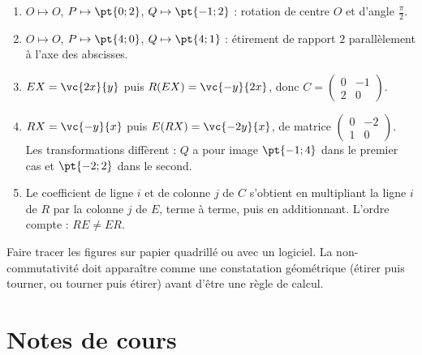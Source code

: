 \begin{solution}[Activité]
\begin{enumerate}
\item $O\mapsto O$, $P\mapsto\pt{0;2}$, $Q\mapsto\pt{-1;2}$ : rotation de centre $O$ et d'angle $\frac\pi2$.
\item $O\mapsto O$, $P\mapsto\pt{4;0}$, $Q\mapsto\pt{4;1}$ : étirement de rapport $2$ parallèlement à l'axe des abscisses.
\item $EX=\vc{2x}{y}$ puis $R(EX)=\vc{-y}{2x}$, donc $C=\begin{pmatrix}0&-1\\2&0\end{pmatrix}$.
\item $RX=\vc{-y}{x}$ puis $E(RX)=\vc{-2y}{x}$, de matrice $\begin{pmatrix}0&-2\\1&0\end{pmatrix}$. Les transformations diffèrent : $Q$ a pour image $\pt{-1;4}$ dans le premier cas et $\pt{-2;2}$ dans le second.
\item Le coefficient de ligne $i$ et de colonne $j$ de $C$ s'obtient en multipliant la ligne $i$ de $R$ par la colonne $j$ de $E$, terme à terme, puis en additionnant. L'ordre compte : $RE\neq ER$.
\end{enumerate}
\end{solution}
\begin{teachernote}
Faire tracer les figures sur papier quadrillé ou avec un logiciel. La non-commutativité doit apparaître comme une constatation géométrique (étirer puis tourner, ou tourner puis étirer) avant d'être une règle de calcul.
\end{teachernote}

\mxnewpage
\section{Notes de cours}
